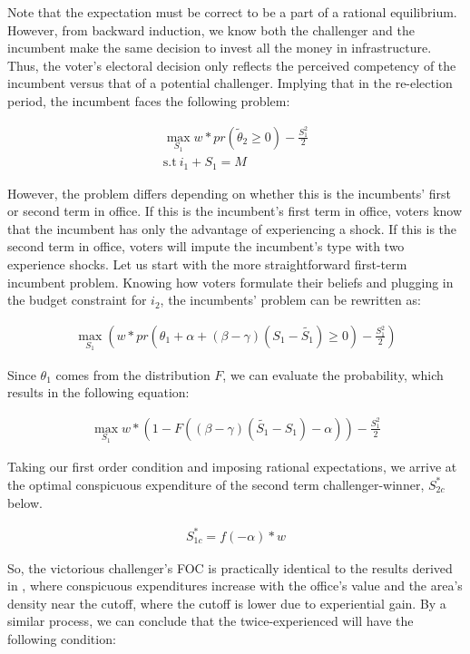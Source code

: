 Note that the expectation must be correct to be a part of a rational equilibrium. 
However, from backward induction, we know both the challenger and the incumbent make the same decision to invest all the money in infrastructure. 
Thus, the voter's electoral decision only reflects the perceived competency of the incumbent versus that of a potential challenger. 
Implying that in the re-election period, the incumbent faces the following problem:

\begin{align}
    \max_{S_1} w*pr(\tilde{\theta}_2 \geq 0)-\frac{S_1^2}{2} \\
    \text{s.t} \ i_1+S_1=M
\end{align}

 However, the problem differs depending on whether this is the incumbents' first or second term in office. 
 If this is the incumbent's first term in office, voters know that the incumbent has only the advantage of experiencing a shock. 
 If this is the second term in office, voters will impute the incumbent's type with two experience shocks. 
 Let us start with the more straightforward first-term incumbent problem. 
 Knowing how voters formulate their beliefs and plugging in the budget constraint for $i_2$, the incumbents' problem can be rewritten as:

\begin{align}
        \max_{S_1} \left ( w*pr(\theta_1+\alpha+ (\beta-\gamma)(S_1-\tilde{S_1}) \geq 0 )-\frac{S_1^2}{2} \right)
\end{align}

Since $\theta_1$ comes from the distribution $F$, we can evaluate the probability, which results in the following equation:

\begin{align}
        \max_{S_1} w*(1-F((\beta-\gamma)(\tilde{S_1}-S_1)-\alpha))-\frac{S_1^2}{2}
\end{align}

Taking our first order condition and imposing rational expectations, we arrive at the optimal conspicuous expenditure of the second term challenger-winner, $S_{2c}^*$ below.

\begin{align}
    S_{1c}^*=f(-\alpha)*w
\end{align}

So, the victorious challenger's FOC is practically identical to the results derived in \cite{gehlbach2021formal}, where conspicuous expenditures increase with the office's value and the area's density near the cutoff, where the cutoff is lower due to experiential gain. 
By a similar process, we can conclude that the twice-experienced will have the following condition:

